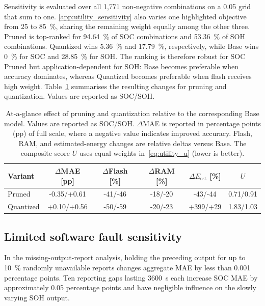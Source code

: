 \documentclass[review]{elsarticle}
\begin{document}
Sensitivity is evaluated over all 1,771 non-negative combinations on a 0.05 grid that sum to one. \ref{app:utility_sensitivity} also varies one highlighted objective from 25 to 85~\%, sharing the remaining weight equally among the other three. Pruned is top-ranked for 94.64~\% of SOC combinations and 53.36~\% of SOH combinations. Quantized wins 5.36~\% and 17.79~\%, respectively, while Base wins 0~\% for SOC and 28.85~\% for SOH. The ranking is therefore robust for SOC Pruned but application-dependent for SOH: Base becomes preferable when accuracy dominates, whereas Quantized becomes preferable when flash receives high weight.
Table~\ref{tab:tradeoff_summary} summarises the resulting changes for pruning and quantization. Values are reported as SOC/SOH.
\begin{table}[tbp]
    \centering
    \caption[Summary of pruning/quantization effects]{At-a-glance effect of pruning and quantization relative to the corresponding Base model. Values are reported as SOC/SOH. $\Delta$MAE is reported in percentage points (pp) of full scale, where a negative value indicates improved accuracy. Flash, RAM, and estimated-energy changes are relative deltas versus Base. The composite score $U$ uses equal weights in~\eqref{eq:utility_u} (lower is better).}
    \label{tab:tradeoff_summary}
    \scriptsize
    \setlength{\tabcolsep}{2.5pt}
    \renewcommand{\arraystretch}{1.05}
    \begin{tabular}{lccccc}
        \toprule
        Variant & $\Delta$MAE [pp] & $\Delta$Flash [\%] & $\Delta$RAM [\%] & $\Delta E_{\mathrm{est}}$ [\%] & $U$ \\
        \midrule
        Pruned & \textcolor{mgGreen}{-0.35}/\textcolor{mgRed}{+0.61} & \textcolor{mgGreen}{-41}/\textcolor{mgGreen}{-46} & \textcolor{mgGreen}{-18}/\textcolor{mgGreen}{-20} & \textcolor{mgGreen}{-43}/\textcolor{mgGreen}{-44} & 0.71/0.91 \\
        Quantized & \textcolor{mgRed}{+0.10}/\textcolor{mgRed}{+0.56} & \textcolor{mgGreen}{-50}/\textcolor{mgGreen}{-59} & \textcolor{mgGreen}{-20}/\textcolor{mgGreen}{-23} & \textcolor{mgRed}{+399}/\textcolor{mgRed}{+29} & 1.83/1.03 \\
        \bottomrule
    \end{tabular}
\end{table}

\subsection{Limited software fault sensitivity}
In the missing-output-report analysis, holding the preceding output for up to 10~\% randomly unavailable reports changes aggregate MAE by less than 0.001 percentage points. Ten reporting gaps lasting 3600~s each increase SOC MAE by approximately 0.05 percentage points and have negligible influence on the slowly varying SOH output.
\end{document}
